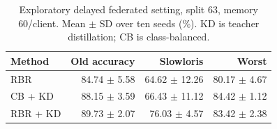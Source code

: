 \begin{table}[t]
\centering
\caption{Exploratory delayed federated setting, split 63, memory 60/client. Mean $\pm$ SD over ten seeds (\%). KD is teacher distillation; CB is class-balanced.}
\label{tab:distill}
\footnotesize
\setlength{\tabcolsep}{3pt}
\begin{tabular}{lrrr}
\toprule
Method & Old accuracy & Slowloris & Worst\\
\midrule
RBR & 84.74 $\pm$ 5.58 & 64.62 $\pm$ 12.26 & 80.17 $\pm$ 4.67\\
CB + KD & 88.15 $\pm$ 3.59 & 66.43 $\pm$ 11.12 & 84.42 $\pm$ 1.12\\
RBR + KD & 89.73 $\pm$ 2.07 & 76.03 $\pm$ 4.57 & 83.42 $\pm$ 2.38\\
\bottomrule
\end{tabular}
\end{table}